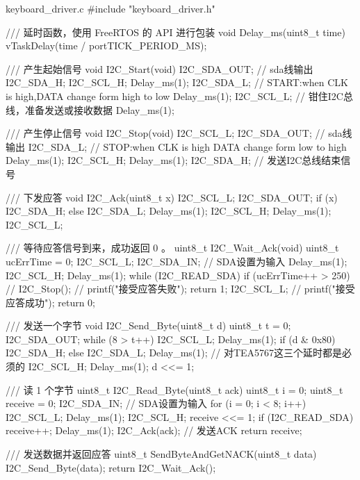 \documentclass[lang=cn,newtx,10pt,scheme=chinese]{elegantbook}
\begin{document}
\begin{mycode}{keyboard\_driver.c}
#include "keyboard_driver.h"

/// 延时函数，使用 FreeRTOS 的 API 进行包装
void Delay_ms(uint8_t time)
{
    vTaskDelay(time / portTICK_PERIOD_MS);
}

/// 产生起始信号
void I2C_Start(void)
{
    I2C_SDA_OUT; // sda线输出
    I2C_SDA_H;
    I2C_SCL_H;
    Delay_ms(1);
    I2C_SDA_L; // START:when CLK is high,DATA change form high to low
    Delay_ms(1);
    I2C_SCL_L; // 钳住I2C总线，准备发送或接收数据
    Delay_ms(1);
}

/// 产生停止信号
void I2C_Stop(void)
{
    I2C_SCL_L;
    I2C_SDA_OUT; // sda线输出
    I2C_SDA_L;   // STOP:when CLK is high DATA change form low to high
    Delay_ms(1);
    I2C_SCL_H;
    Delay_ms(1);
    I2C_SDA_H; // 发送I2C总线结束信号
}

/// 下发应答
void I2C_Ack(uint8_t x)
{
    I2C_SCL_L;
    I2C_SDA_OUT;
    if (x)
    {
        I2C_SDA_H;
    }
    else
    {
        I2C_SDA_L;
    }
    Delay_ms(1);
    I2C_SCL_H;
    Delay_ms(1);
    I2C_SCL_L;
}

/// 等待应答信号到来，成功返回 0 。
uint8_t I2C_Wait_Ack(void)
{
    uint8_t ucErrTime = 0;
    I2C_SCL_L;
    I2C_SDA_IN; // SDA设置为输入
    Delay_ms(1);
    I2C_SCL_H;
    Delay_ms(1);
    while (I2C_READ_SDA)
    {
        if (ucErrTime++ > 250)
        {
            // I2C_Stop();
            // printf("接受应答失败\n");
            return 1;
        }
    }
    I2C_SCL_L;
    // printf("接受应答成功\n");
    return 0;
}

/// 发送一个字节
void I2C_Send_Byte(uint8_t d)
{
    uint8_t t = 0;
    I2C_SDA_OUT;
    while (8 > t++)
    {
        I2C_SCL_L;
        Delay_ms(1);
        if (d & 0x80)
        {
            I2C_SDA_H;
        }
        else
        {
            I2C_SDA_L;
        }
        Delay_ms(1); // 对TEA5767这三个延时都是必须的
        I2C_SCL_H;
        Delay_ms(1);
        d <<= 1;
    }
}

/// 读 1 个字节
uint8_t I2C_Read_Byte(uint8_t ack)
{
    uint8_t i = 0;
    uint8_t receive = 0;
    I2C_SDA_IN; // SDA设置为输入
    for (i = 0; i < 8; i++)
    {
        I2C_SCL_L;
        Delay_ms(1);
        I2C_SCL_H;
        receive <<= 1;
        if (I2C_READ_SDA)
        {
            receive++;
        }
        Delay_ms(1);
    }
    I2C_Ack(ack); // 发送ACK
    return receive;
}

/// 发送数据并返回应答
uint8_t SendByteAndGetNACK(uint8_t data)
{
    I2C_Send_Byte(data);
    return I2C_Wait_Ack();
}


\end{mycode}
\end{document}
